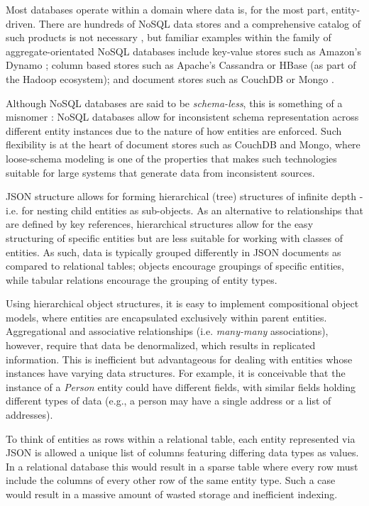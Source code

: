 Most databases operate within a domain where data is, for the most part, entity-driven. There are hundreds of NoSQL data stores and a comprehensive catalog of such products is not necessary \cite{GANESHCHANDRA201513}, but familiar examples within the family of aggregate-orientated NoSQL databases include key-value stores such as Amazon's Dynamo \cite{sadalage2012}; column based stores such as Apache's Cassandra \cite{sadalage2012} or HBase \cite{sadalage2012} (as part of the Hadoop ecosystem); and document stores such as CouchDB or Mongo \cite{sadalage2012}.

Although NoSQL databases are said to be \textit{schema-less}, this is something of a misnomer \cite{ATZENI2016}: NoSQL databases allow for inconsistent schema representation across different entity instances due to the nature of how entities are enforced. Such flexibility is at the heart of document stores such as CouchDB and Mongo, where loose-schema modeling is one of the properties that makes such technologies suitable for large systems that generate data from inconsistent sources.

JSON structure allows for forming hierarchical (tree) structures of infinite depth - i.e. for nesting child entities as sub-objects. As an alternative to relationships that are defined by key references, hierarchical structures allow for the easy structuring of specific entities but are less suitable for working with classes of entities. As such, data is typically grouped differently in JSON documents as compared to relational tables; objects encourage groupings of specific entities, while tabular relations encourage the grouping of entity types.

Using hierarchical object structures, it is easy to implement compositional object models, where entities are encapsulated exclusively within parent entities. Aggregational and associative relationships (i.e. \textit{many-many} associations), however, require that data be denormalized, which results in replicated information. This is inefficient but advantageous for dealing with entities whose instances have varying data structures. For example, it is conceivable that the instance of a \textit{Person} entity could have different fields, with similar fields holding different types of data (e.g., a person may have a single address or a list of addresses).

To think of entities as rows within a relational table, each entity represented via JSON is allowed a unique list of columns featuring differing data types as values. In a relational database this would result in a sparse table where every row must include the columns of every other row of the same entity type. Such a case would result in a massive amount of wasted storage and inefficient indexing.

